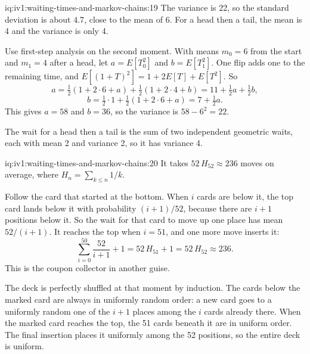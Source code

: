 \begin{solution}{iq:iv1:waiting-times-and-markov-chains:19}
The variance is 22, so the standard deviation is about $4.7$, close to the mean of 6. For a head then a tail, the mean is 4 and the variance is only 4.

Use first-step analysis on the second moment. With means $m_0 = 6$ from the start and $m_1 = 4$ after a head, let $a = E[T_0^2]$ and $b = E[T_1^2]$. One flip adds one to the remaining time, and $E[(1 + T)^2] = 1 + 2E[T] + E[T^2]$. So
\[
a = \tfrac12(1 + 2 \cdot 6 + a) + \tfrac12(1 + 2 \cdot 4 + b) = 11 + \tfrac12 a + \tfrac12 b,
\]
\[
b = \tfrac12 \cdot 1 + \tfrac12(1 + 2 \cdot 6 + a) = 7 + \tfrac12 a.
\]
This gives $a = 58$ and $b = 36$, so the variance is $58 - 6^2 = 22$.

The wait for a head then a tail is the sum of two independent geometric waits, each with mean 2 and variance 2, so it has variance 4.

\end{solution}

\begin{solution}{iq:iv1:waiting-times-and-markov-chains:20}
It takes $52\,H_{52} \approx 236$ moves on average, where $H_n = \sum_{k \le n} 1/k$.

Follow the card that started at the bottom. When $i$ cards are below it, the top card lands below it with probability $(i + 1)/52$, because there are $i + 1$ positions below it. So the wait for that card to move up one place has mean $52/(i + 1)$. It reaches the top when $i = 51$, and one more move inserts it:
\[
\sum_{i=0}^{50} \frac{52}{i+1} + 1 = 52\,H_{51} + 1 = 52\,H_{52} \approx 236.
\]
This is the coupon collector in another guise.

The deck is perfectly shuffled at that moment by induction. The cards below the marked card are always in uniformly random order: a new card goes to a uniformly random one of the $i + 1$ places among the $i$ cards already there. When the marked card reaches the top, the 51 cards beneath it are in uniform order. The final insertion places it uniformly among the 52 positions, so the entire deck is uniform.

\end{solution}

